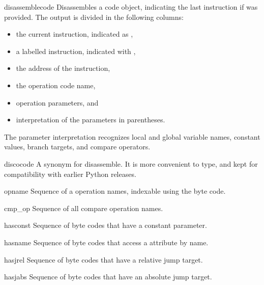 \begin{funcdesc}{disassemble}{code}
Disassembles a code object, indicating the last instruction if 
was provided.  The output is divided in the following columns:
\begin{itemize}
\item the current instruction, indicated as \code{-->},
\item a labelled instruction, indicated with \code{>>},
\item the address of the instruction,
\item the operation code name,
\item operation parameters, and
\item interpretation of the parameters in parentheses.
\end{itemize}
The parameter interpretation recognizes local and global
variable names, constant values, branch targets, and compare
operators.
\end{funcdesc}

\begin{funcdesc}{disco}{code}
A synonym for disassemble.  It is more convenient to type, and kept
for compatibility with earlier Python releases.
\end{funcdesc}

\begin{datadesc}{opname}
Sequence of a operation names, indexable using the byte code.
\end{datadesc}

\begin{datadesc}{cmp_op}
Sequence of all compare operation names.
\end{datadesc}

\begin{datadesc}{hasconst}
Sequence of byte codes that have a constant parameter.
\end{datadesc}

\begin{datadesc}{hasname}
Sequence of byte codes that access a attribute by name.
\end{datadesc}

\begin{datadesc}{hasjrel}
Sequence of byte codes that have a relative jump target.
\end{datadesc}

\begin{datadesc}{hasjabs}
Sequence of byte codes that have an absolute jump target.
\end{datadesc}

